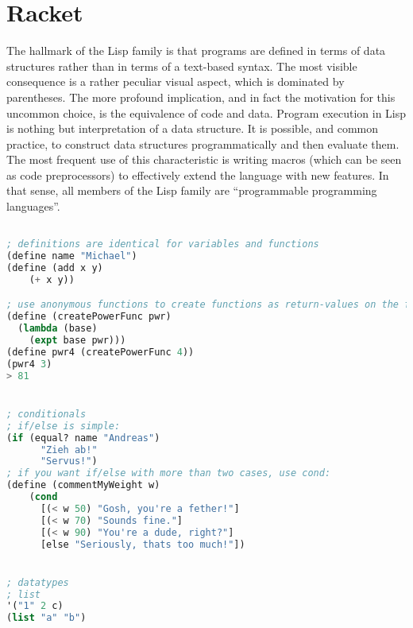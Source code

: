 \section{Racket}

The hallmark of the Lisp family is that programs are defined in terms of data structures rather than in terms of a text-based syntax. The most visible consequence is a rather peculiar visual aspect, which is dominated by parentheses. The more profound implication, and in fact the motivation for this uncommon choice, is the equivalence of code and data. Program execution in Lisp is nothing but interpretation of a data structure. It is possible, and common practice, to construct data structures programmatically and then evaluate them. The most frequent use of this characteristic is writing macros (which can be seen as code preprocessors) to effectively extend the language with new features. In that sense, all members of the Lisp family are “programmable programming languages”. 

\begin{lstlisting}[language=lisp]

; definitions are identical for variables and functions
(define name "Michael")
(define (add x y)
    (+ x y))

; use anonymous functions to create functions as return-values on the fly
(define (createPowerFunc pwr)
  (lambda (base)
    (expt base pwr)))
(define pwr4 (createPowerFunc 4))
(pwr4 3)
> 81


; conditionals
; if/else is simple:
(if (equal? name "Andreas")
      "Zieh ab!"
      "Servus!")
; if you want if/else with more than two cases, use cond:
(define (commentMyWeight w)
    (cond
      [(< w 50) "Gosh, you're a fether!"]
      [(< w 70) "Sounds fine."]
      [(< w 90) "You're a dude, right?"]
      [else "Seriously, thats too much!"])


; datatypes
; list
'("1" 2 c)
(list "a" "b")


\end{lstlisting}



